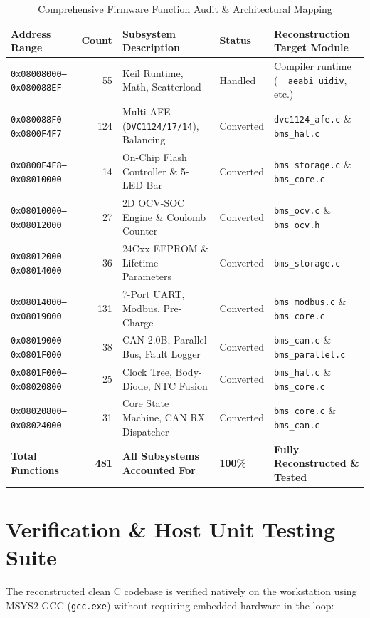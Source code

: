 \documentclass[10pt,a4paper]{article}
\begin{document}
\begin{table}[htbp]
\centering
\caption{Comprehensive Firmware Function Audit \& Architectural Mapping}
\label{tab:function_audit}
\begin{tabularx}{\textwidth}{lrllX}
\toprule
\textbf{Address Range} & \textbf{Count} & \textbf{Subsystem Description} & \textbf{Status} & \textbf{Reconstruction Target Module} \\
\midrule
\texttt{0x08008000--0x080088EF} & 55 & Keil Runtime, Math, Scatterload & Handled & Compiler runtime (\texttt{\_\_aeabi\_uidiv}, etc.) \\
\texttt{0x080088F0--0x0800F4F7} & 124 & Multi-AFE (\texttt{DVC1124/17/14}), Balancing & Converted & \texttt{dvc1124\_afe.c} \& \texttt{bms\_hal.c} \\
\texttt{0x0800F4F8--0x08010000} & 14 & On-Chip Flash Controller \& 5-LED Bar & Converted & \texttt{bms\_storage.c} \& \texttt{bms\_core.c} \\
\texttt{0x08010000--0x08012000} & 27 & 2D OCV-SOC Engine \& Coulomb Counter & Converted & \texttt{bms\_ocv.c} \& \texttt{bms\_ocv.h} \\
\texttt{0x08012000--0x08014000} & 36 & 24Cxx EEPROM \& Lifetime Parameters & Converted & \texttt{bms\_storage.c} \\
\texttt{0x08014000--0x08019000} & 131 & 7-Port UART, Modbus, Pre-Charge & Converted & \texttt{bms\_modbus.c} \& \texttt{bms\_core.c} \\
\texttt{0x08019000--0x0801F000} & 38 & CAN 2.0B, Parallel Bus, Fault Logger & Converted & \texttt{bms\_can.c} \& \texttt{bms\_parallel.c} \\
\texttt{0x0801F000--0x08020800} & 25 & Clock Tree, Body-Diode, NTC Fusion & Converted & \texttt{bms\_hal.c} \& \texttt{bms\_core.c} \\
\texttt{0x08020800--0x08024000} & 31 & Core State Machine, CAN RX Dispatcher & Converted & \texttt{bms\_core.c} \& \texttt{bms\_can.c} \\
\midrule
\textbf{Total Functions} & \textbf{481} & \textbf{All Subsystems Accounted For} & \textbf{100\%} & \textbf{Fully Reconstructed \& Tested} \\
\bottomrule
\end{tabularx}
\end{table}

\section{Verification \& Host Unit Testing Suite}
The reconstructed clean C codebase is verified natively on the workstation using MSYS2 GCC (\texttt{gcc.exe}) without requiring embedded hardware in the loop:
\end{document}
